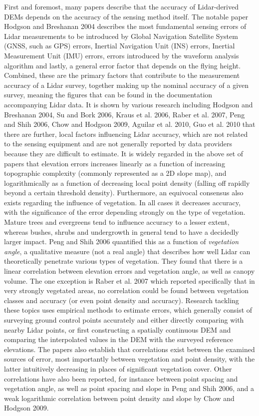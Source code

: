 First and foremost, many papers describe that the accuracy of Lidar-derived DEMs depends on the accuracy of the sensing method itself. The notable paper Hodgson and Breshanan 2004 describes the most fundamental sensing errors of Lidar measurements to be introduced by Global Navigation Satellite System (GNSS, such as GPS) errors, Inertial Navigation Unit (INS) errors, Inertial Measurement Unit (IMU) errors, errors introduced by the waveform analysis algorithm and lastly, a general error factor that depends on the flying height. Combined, these are the primary factors that contribute to the measurement accuracy of a Lidar survey, together making up the nominal accuracy of a given survey, meaning the figures that can be found in the documentation accompanying Lidar data. It is shown by various research including Hodgson and Breshanan 2004, Su and Bork 2006, Kraus et al. 2006, Raber et al. 2007, Peng and Shih 2006, Chow and Hodgson 2009, Aguilar et al. 2010, Guo et al. 2010 that there are further, local factors influencing Lidar accuracy, which are not related to the sensing equipment and are not generally reported by data providers because they are difficult to estimate. It is widely regarded in the above set of papers that elevation errors increases linearly as a function of increasing topographic complexity (commonly represented as a 2D slope map), and logarithmically as a function of decreasing local point density (falling off rapidly beyond a certain threshold density). Furthermore, an equivocal consensus also exists regarding the influence of vegetation. In all cases it decreases accuracy, with the significance of the error depending strongly on the type of vegetation. Mature trees and evergreens tend to influence accuracy to a lesser extent, whereas bushes, shrubs and undergrowth in general tend to have a decidedly larger impact. Peng and Shih 2006 quantified this as a function of \textit{vegetation angle}, a qualitative measure (not a real angle) that describes how well Lidar can theoretically penetrate various types of vegetation. They found that there is a linear correlation between elevation errors and vegetation angle, as well as canopy volume. The one exception is Raber et al. 2007 which reported specifically that in very strongly vegetated areas, no correlation could be found between vegetation classes and accuracy (or even point density and accuracy). Research tackling these topics uses empirical methods to estimate errors, which generally consist of surveying ground control points accurately and either directly comparing with nearby Lidar points, or first constructing a spatially continuous DEM and comparing the interpolated values in the DEM with the surveyed reference elevations. The papers also establish that correlations exist between the examined sources of error, most importantly between vegetation and point density, with the latter intuitively decreasing in places of significant vegetation cover. Other correlations have also been reported, for instance between point spacing and vegetation angle, as well as point spacing and slope in Peng and Shih 2006, and a weak logarithmic correlation between point density and slope by Chow and Hodgson 2009.

